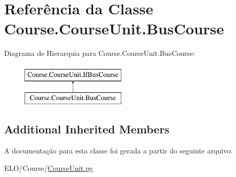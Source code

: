 \hypertarget{classCourse_1_1CourseUnit_1_1BusCourse}{\section{Referência da Classe Course.\-Course\-Unit.\-Bus\-Course}
\label{classCourse_1_1CourseUnit_1_1BusCourse}
}
Diagrama de Hierarquia para Course.\-Course\-Unit.\-Bus\-Course\-:\begin{figure}[H]
\begin{center}
\leavevmode
\includegraphics[height=2.000000cm]{d9/d88/classCourse_1_1CourseUnit_1_1BusCourse}
\end{center}
\end{figure}
\subsection*{Additional Inherited Members}


A documentação para esta classe foi gerada a partir do seguinte arquivo\-:\begin{DoxyCompactItemize}
\item 
E\-L\-O/\-Course/\hyperlink{CourseUnit_8py}{Course\-Unit.\-py}\end{DoxyCompactItemize}
